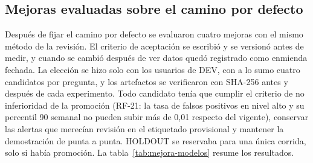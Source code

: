 \subsection{Mejoras evaluadas sobre el camino por defecto}
\label{sec:mejora-modelos}
Después de fijar el camino por defecto se evaluaron cuatro mejoras con el mismo método de la revisión. El criterio de aceptación se escribió y se versionó antes de medir, y cuando se cambió después de ver datos quedó registrado como enmienda fechada. La elección se hizo solo con los usuarios de DEV, con a lo sumo cuatro candidatos por pregunta, y los artefactos se verificaron con SHA-256 antes y después de cada experimento. Todo candidato tenía que cumplir el criterio de no inferioridad de la promoción (RF-21: la tasa de falsos positivos en nivel alto y su percentil 90 semanal no pueden subir más de 0,01 respecto del vigente), conservar las alertas que merecían revisión en el etiquetado provisional y mantener la demostración de punta a punta. HOLDOUT se reservaba para una única corrida, solo si había promoción. La tabla~\ref{tab:mejora-modelos} resume los resultados.


